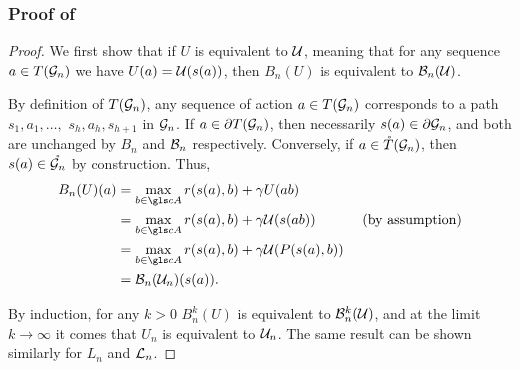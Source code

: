 \subsubsection{Proof of }
\label{sec:proof-equivalence}
\begin{proof}	
We first show that if $U$ is equivalent to $\mathcal{U}$, meaning that for any sequence $a\in T(\mathcal{G}_n)$ we have $U(a) = \mathcal{U}(s(a))$, then $B_n(U)$ is equivalent to $\mathcal{B}_n(\mathcal{U})$.

By definition of $T(\mathcal{G}_n)$, any sequence of action $a\in T(\mathcal{G}_n)$ corresponds to a path $s_1, a_1,\dots,$ $s_{h}, a_{h}, s_{h+1}$ in $\mathcal{G}_n$. If $a\in{\partial T(\mathcal{G}_n)}$, then necessarily $s(a)\in{\partial \mathcal{G}_n}$, and both are unchanged by $B_n$ and $\mathcal{B}_n$ respectively. Conversely, if $a\in\mathring{T}(\mathcal{G}_n)$, then $s(a)\in\mathring{\mathcal{G}_n}$ by construction. Thus, 
\begin{align*}
B_n(U)(a) &= \max_{b\in \cA} r(s(a), b) + \gamma U({ab}) &\\
&= \max_{b\in \cA} r(s(a), b) + \gamma \cU(s({ab})) &\text{ (by assumption)} \\
&= \max_{b\in \cA} r(s(a), b) + \gamma \cU(P(s({a}),b))\\
&= \cB_n(\cU_n)(s(a)).
\end{align*}

By induction, for any $k>0$ $B_n^k(U)$ is equivalent to $\mathcal{B}_n^k(\mathcal{U})$, and at the limit $k\rightarrow\infty$ it comes that $U_n$ is equivalent to $\mathcal{U}_n$. The same result can be shown similarly for $L_n$ and $\mathcal{L}_n$.
\end{proof}


